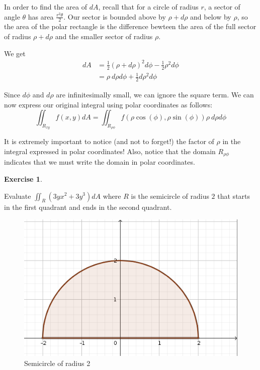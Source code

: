 \documentclass[
]{book}
\theoremstyle{definition}
\theoremstyle{definition}
\theoremstyle{definition}
\newtheorem{exercise}{Exercise}[chapter]
\theoremstyle{definition}
\theoremstyle{remark}
\begin{document}
In order to find the area of \(dA\), recall that for a circle of radius \(r\), a sector of angle \(\theta\) has area \(\frac{r^2\theta}{2}\). Our sector is bounded above by \(\rho + d\rho\) and below by \(\rho\), so the area of the polar rectangle is the difference bewteen the area of the full sector of radius \(\rho + d\rho\) and the smaller sector of radius \(\rho\).

We get
\begin{align*}
dA &= \frac{1}{2}(\rho+d\rho)^2 d\phi- \frac{1}{2}\rho^2 d\phi\\
&= \rho~d\rho d\phi + \frac{1}{2} d\rho^2 d\phi
\end{align*}

Since \(d\phi\) and \(d\rho\) are infinitesimally small, we can ignore the square term. We can now express our original integral using polar coordinates as follows: \[\displaystyle \iint_{R_{xy}} f(x,y)dA = \iint_{R_{\rho \phi}} f(\rho\cos(\phi), \rho\sin(\phi)) \rho~d\rho d\phi\]

It is extremely important to notice (and not to forget!) the factor of \(\rho\) in the integral expressed in polar coordinates! Also, notice that the domain \(R_{\rho\phi}\) indicates that we must write the domain in polar coordinates.

\begin{exercise}
\protect\hypertarget{exr:unlabeled-div-91}{}\label{exr:unlabeled-div-91}

Evaluate \(\displaystyle \iint_R (3yx^2+3y^3)dA\) where \(R\) is the semicircle of radius \(2\) that starts in the first quadrant and ends in the second quadrant.

\begin{figure}

{\centering \includegraphics[width=0.3\linewidth]{images/lec-12-ex-1} 

}

\caption{Semicircle of radius 2}\label{fig:unnamed-chunk-26}
\end{figure}

\end{exercise}
\end{document}
